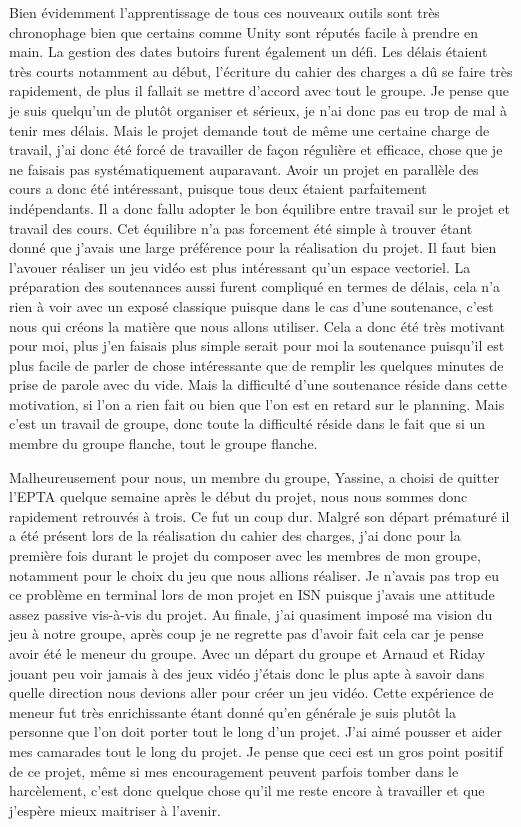 \documentclass[a4paper, 12pt]{article}
\begin{document}
	\medbreak
\par Bien évidemment l’apprentissage de tous ces nouveaux outils sont très chronophage bien que certains comme Unity sont réputés facile à prendre en main. La gestion des dates butoirs furent également un défi. Les délais étaient très courts notamment au début, l’écriture du cahier des charges a dû se faire très rapidement, de plus il fallait se mettre d’accord avec tout le groupe. Je pense que je suis quelqu’un de plutôt organiser et sérieux, je n’ai donc pas eu trop de mal à tenir mes délais. Mais le projet demande tout de même une certaine charge de travail, j’ai donc été forcé de travailler de façon régulière et efficace, chose que je ne faisais pas systématiquement auparavant. Avoir un projet en parallèle des cours a donc été intéressant, puisque tous deux étaient parfaitement indépendants. Il a donc fallu adopter le bon équilibre entre travail sur le projet et travail des cours. Cet équilibre n’a pas forcement été simple à trouver étant donné que j’avais une large préférence pour la réalisation du projet. Il faut bien l’avouer réaliser un jeu vidéo est plus intéressant qu’un espace vectoriel. La préparation des soutenances aussi furent compliqué en termes de délais, cela n’a rien à voir avec un exposé classique puisque dans le cas d’une soutenance, c’est nous qui créons la matière que nous allons utiliser. Cela a donc été très motivant pour moi, plus j’en faisais plus simple serait pour moi la soutenance puisqu’il est plus facile de parler de chose intéressante que de remplir les quelques minutes de prise de parole avec du vide. Mais la difficulté d’une soutenance réside dans cette motivation, si l’on a rien fait ou bien que l’on est en retard sur le planning. Mais c’est un travail de groupe, donc toute la difficulté réside dans le fait que si un membre du groupe flanche, tout le groupe flanche.
	\medbreak
\par Malheureusement pour nous, un membre du groupe, Yassine, a choisi de quitter l’EPTA quelque semaine après le début du projet, nous nous sommes donc rapidement retrouvés à trois. Ce fut un coup dur. Malgré son départ prématuré il a été présent lors de la réalisation du cahier des charges, j’ai donc pour la première fois durant le projet du composer avec les membres de mon groupe, notamment pour le choix du jeu que nous allions réaliser. Je n’avais pas trop eu ce problème en terminal lors de mon projet en ISN puisque j’avais une attitude assez passive vis-à-vis du projet. Au finale, j’ai quasiment imposé ma vision du jeu à notre groupe, après coup je ne regrette pas d’avoir fait cela car je pense avoir été le meneur du groupe. Avec un départ du groupe et Arnaud et Riday jouant peu voir jamais à des jeux vidéo j’étais donc le plus apte à savoir dans quelle direction nous devions aller pour créer un jeu vidéo. Cette expérience de meneur fut très enrichissante étant donné qu’en générale je suis plutôt la personne que l’on doit porter tout le long d’un projet. J’ai aimé pousser et aider mes camarades tout le long du projet. Je pense que ceci est un gros point positif de ce projet, même si mes encouragement peuvent parfois tomber dans le harcèlement, c’est donc quelque chose qu’il me reste encore à travailler et que j’espère mieux maitriser à l’avenir.
\end{document}
